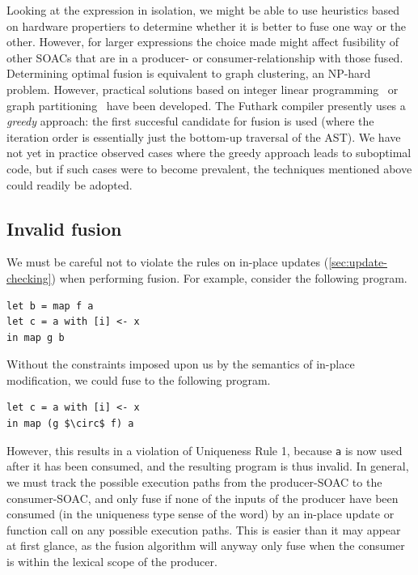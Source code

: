 Looking at the expression in isolation, we might be able to use
heuristics based on hardware propertiers to determine whether it is
better to fuse one way or the other.  However, for larger expressions
the choice made might affect fusibility of other SOACs that are in a
producer- or consumer-relationship with those fused.  Determining
optimal fusion is equivalent to graph clustering, an NP-hard problem.
However, practical solutions based on integer linear
programming~\cite{Megiddo:1997:OWL:258492.258520} or graph
partitioning~\cite{Kristensen:2016:FPA:2967938.2967945} have been
developed.  The Futhark compiler presently uses a \textit{greedy}
approach: the first succesful candidate for fusion is used (where the
iteration order is essentially just the bottom-up traversal of the
AST).  We have not yet in practice observed cases where the greedy
approach leads to suboptimal code, but if such cases were to become
prevalent, the techniques mentioned above could readily be adopted.

\subsection{Invalid fusion}
\label{sec:invalidfusion}

We must be careful not to violate the rules on in-place updates
(\cref{sec:update-checking}) when performing fusion.  For example,
consider the following program.
\begin{lstlisting}
let b = map f a
let c = a with [i] <- x
in map g b
\end{lstlisting}
Without the constraints imposed upon us by the semantics of in-place
modification, we could fuse to the following program.
\begin{lstlisting}[mathescape]
let c = a with [i] <- x
in map (g $\circ$ f) a
\end{lstlisting}
However, this results in a violation of Uniqueness Rule 1, because
\texttt{a} is now used after it has been consumed, and the resulting
program is thus invalid.  In general, we must track the possible
execution paths from the producer-SOAC to the consumer-SOAC, and only
fuse if none of the inputs of the producer have been consumed (in the
uniqueness type sense of the word) by an in-place update or function
call on any possible execution paths.  This is easier than it may
appear at first glance, as the fusion algorithm will anyway only fuse
when the consumer is within the lexical scope of the producer.

